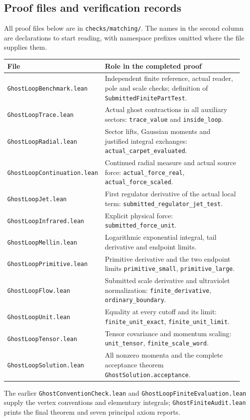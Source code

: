 \documentclass[11pt]{article}
\newcommand{\code}[1]{{\small\nolinkurl{#1}}}
\begin{document}
\subsection{Proof files and verification records}

All proof files below are in \code{checks/matching/}. The names in the
second column are declarations to start reading, with namespace
prefixes omitted where the file supplies them.
\begin{longtable}{@{}p{0.31\linewidth}p{0.65\linewidth}@{}}
\toprule
File & Role in the completed proof\\\midrule\endhead
\code{GhostLoopBenchmark.lean} & Independent finite reference, actual
reader, pole and scale checks; definition of
\code{SubmittedFinitePartTest}.\\
\code{GhostLoopTrace.lean} & Actual ghost contractions in all auxiliary
sectors: \code{trace_value} and \code{inside_loop}.\\
\code{GhostLoopRadial.lean} & Sector lifts, Gaussian moments and justified
integral exchanges: \code{actual_carpet_evaluated}.\\
\code{GhostLoopContinuation.lean} & Continued radial measure and actual
source force: \code{actual_force_real}, \code{actual_force_scaled}.\\
\code{GhostLoopJet.lean} & First regulator derivative of the actual local
term: \code{submitted_regulator_jet_test}.\\
\code{GhostLoopInfrared.lean} & Explicit physical force:
\code{submitted_force_unit}.\\
\code{GhostLoopMellin.lean} & Logarithmic exponential integral, tail
derivative and endpoint limits.\\
\code{GhostLoopPrimitive.lean} & Primitive derivative and the two
endpoint limits \code{primitive_small}, \code{primitive_large}.\\
\code{GhostLoopFlow.lean} & Submitted scale derivative and ultraviolet
normalization: \code{finite_derivative}, \code{ordinary_boundary}.\\
\code{GhostLoopUnit.lean} & Equality at every cutoff and its limit:
\code{finite_unit_exact}, \code{finite_unit_limit}.\\
\code{GhostLoopTensor.lean} & Tensor covariance and momentum scaling:
\code{unit_tensor}, \code{finite_scale_word}.\\
\code{GhostLoopSolution.lean} & All nonzero momenta and the complete
acceptance theorem \code{GhostSolution.acceptance}.\\
\bottomrule
\end{longtable}
The earlier \code{GhostConventionCheck.lean} and
\code{GhostLoopFiniteEvaluation.lean} supply the vertex conventions
and elementary integrals; \code{GhostFiniteAudit.lean} prints the
final theorem and seven principal axiom reports.
\end{document}
